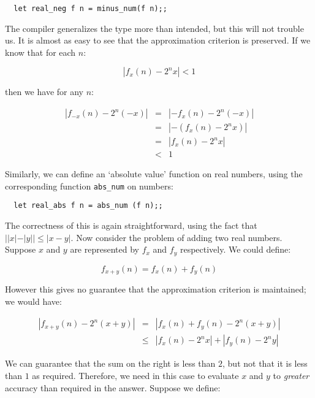 \begin{boxed}\begin{verbatim}
  let real_neg f n = minus_num(f n);;
\end{verbatim}\end{boxed}

The compiler generalizes the type more than intended, but this will not trouble
us. It is almost as easy to see that the approximation criterion is preserved.
If we know that for each $n$:

$$ |f_x(n) - 2^n x| < 1 $$

\noindent then we have for any $n$:

\begin{eqnarray*}
|f_{-x}(n) - 2^n (-x)| & = & |-f_x(n) - 2^n (-x)|       \\
                       & = & |-(f_x(n) - 2^n x)|        \\
                       & = & |f_x(n) - 2^n x|           \\
                       & < & 1
\end{eqnarray*}

Similarly, we can define an `absolute value' function on real numbers, using
the corresponding function {\tt abs\_num} on numbers:

\begin{boxed}\begin{verbatim}
  let real_abs f n = abs_num (f n);;
\end{verbatim}\end{boxed}

The correctness of this is again straightforward, using the fact that $||x| -
|y|| \leq |x - y|$. Now consider the problem of adding two real numbers.
Suppose $x$ and $y$ are represented by $f_x$ and $f_y$ respectively. We could
define:

$$ f_{x + y}(n) = f_x(n) + f_y(n) $$

However this gives no guarantee that the approximation criterion is maintained;
we would have:

\begin{eqnarray*}
|f_{x + y}(n) - 2^n (x + y)| & = & |f_x(n) + f_y(n) - 2^n (x + y)|      \\
                             & \leq & |f_x(n) - 2^n x| + |f_y(n) - 2^n y|
\end{eqnarray*}

We can guarantee that the sum on the right is less than $2$, but not that it is
less than $1$ as required. Therefore, we need in this case to evaluate $x$ and
$y$ to {\em greater} accuracy than required in the answer. Suppose we define:

